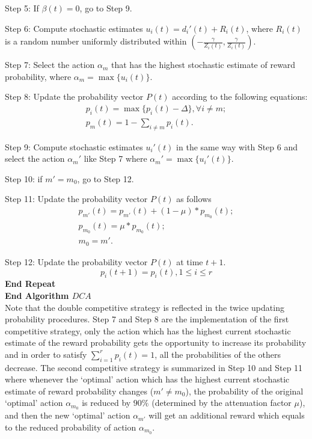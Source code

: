 Step 5: If $\beta (t) = 0$, go to Step 9.

Step 6: Compute stochastic estimates ${u_i}(t) = d_i'(t) + {R_i}(t)$, where ${R_i}(t)$ is a random number uniformly distributed within $( - \frac{\gamma }{{{Z_i}(t)}},\frac{\gamma }{{{Z_i}(t)}})$.

Step 7: Select the action ${\alpha _m}$ that has the highest stochastic estimate of reward probability, where ${\alpha _m} = \max \{ {u_i}(t)\} $.

Step 8: Update the probability vector $P(t)$ according to the following equations:
\[\begin{array}{l}
{p_i}(t) = \max \{ {p_i}(t) - \Delta \} ,\forall i \ne m;\\
{p_m}(t) = 1 - \sum\limits_{i \ne m} {{p_i}(t)} .
\end{array}\]

Step 9: Compute stochastic estimates $u_i'(t)$ in the same way with Step 6 and select the action ${\alpha _m'}$ like Step 7 where ${\alpha _m'} = \max \{ u_i'(t)\} $.

Step 10: if $m' = {m_0}$, go to Step 12.

Step 11: Update the probability vector $P(t)$ as follows
\[\begin{array}{l}
{p_{m'}}(t) = {p_{m'}}(t) + (1 - \mu )*{p_{{m_0}}}(t);\\
{p_{{m_0}}}(t) = \mu *{p_{{m_0}}}(t);\\
{m_0} = m'.
\end{array}\]

Step 12: Update the probability vector $P(t)$ at time $t+1$.
\[{p_i}(t + 1) = {p_i}(t),1 \le i \le r\]
\textbf{End Repeat} \\
\textbf{End Algorithm $DCA$} \\

Note that the double competitive strategy is reflected in the twice updating probability procedures. Step 7 and Step 8 are the implementation of the first competitive strategy, only the action   which has the highest current stochastic estimate of the reward probability gets the opportunity to increase its probability and in order to satisfy $\sum_{i = 1}^r {p_i(t) = 1} $, all the probabilities of the others decrease. The second competitive strategy is summarized in Step 10 and Step 11 where whenever the ‘optimal’ action which has the highest current stochastic estimate of reward probability changes ($m' \ne {m_0}$), the probability of the original ‘optimal’ action ${\alpha _{{m_0}}}$ is reduced by $90\%$ (determined by the attenuation factor $\mu$), and then the new ‘optimal’ action ${\alpha _{m'}}$ will get an additional reward which equals to the reduced probability of action ${\alpha _{{m_0}}}$.


